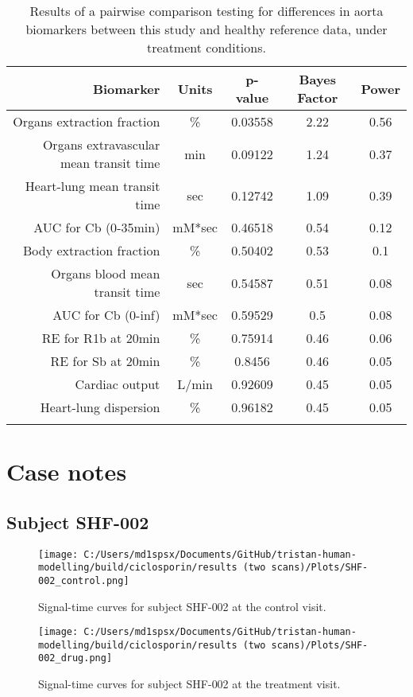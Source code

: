 \documentclass{epflreport}%
\begin{document}
\begin{longtable}{rcccc}%
\hline%
Biomarker&Units&p{-}value&Bayes Factor&Power\\%
\hline%
Organs extraction fraction&\%&0.03558&2.22&0.56\\%
Organs extravascular mean transit time&min&0.09122&1.24&0.37\\%
Heart{-}lung mean transit time&sec&0.12742&1.09&0.39\\%
AUC for Cb (0{-}35min)&mM*sec&0.46518&0.54&0.12\\%
Body extraction fraction&\%&0.50402&0.53&0.1\\%
Organs blood mean transit time&sec&0.54587&0.51&0.08\\%
AUC for Cb (0{-}inf)&mM*sec&0.59529&0.5&0.08\\%
RE for R1b at 20min&\%&0.75914&0.46&0.06\\%
RE for Sb at 20min&\%&0.8456&0.46&0.05\\%
Cardiac output&L/min&0.92609&0.45&0.05\\%
Heart{-}lung dispersion&\%&0.96182&0.45&0.05\\%
\hline%
\caption{Results of a pairwise comparison testing for differences in aorta biomarkers between this study and healthy reference data, under treatment conditions.} \\%
\end{longtable}%
\clearpage%
\section{Case notes}%
\label{sec:Casenotes}%

%
\subsection{Subject SHF{-}002}%
\label{subsec:SubjectSHF{-}002}%

%


\begin{figure}[h!]%
\centering%
\texttt{[image: C:/Users/md1spsx/Documents/GitHub/tristan-human-modelling/build/ciclosporin/results (two scans)/Plots/SHF-002\_control.png]}%
\caption{Signal{-}time curves for subject SHF{-}002 at the control visit.}%
\end{figure}

%


\begin{figure}[h!]%
\centering%
\texttt{[image: C:/Users/md1spsx/Documents/GitHub/tristan-human-modelling/build/ciclosporin/results (two scans)/Plots/SHF-002\_drug.png]}%
\caption{Signal{-}time curves for subject SHF{-}002 at the treatment visit.}%
\end{figure}
\end{document}
